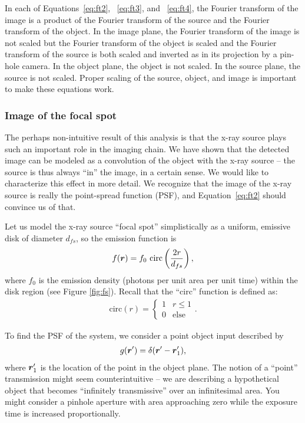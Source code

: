 \documentclass[mphy386-notes.tex]{subfiles}
\begin{document}
In each of Equations~\ref{eq:ft2}, ~\ref{eq:ft3}, and ~\ref{eq:ft4}, the Fourier transform of the image is a 
product of the Fourier transform of the source and the Fourier transform of the object.
In the image plane, the Fourier transform of the image is not scaled but the Fourier
transform of the object is scaled and the Fourier transform of the source is both scaled 
and inverted as in its projection by a pin-hole camera.  In the object plane, the object
is not scaled.  In the source plane, the source is not scaled.  Proper scaling of the source, object, and 
image is important to make these equations work.

\subsubsection{Image of the focal spot}

The perhaps non-intuitive result of this analysis is that the x-ray source plays
such an important role in the imaging chain. We have shown that the detected
image can be modeled as a convolution of the object with the x-ray source -- the
source is thus always ``in'' the image, in a certain sense. We would like to
characterize this effect in more detail.  We recognize that the image of the x-ray source
is really the point-spread function (PSF), and Equation~\ref{eq:ft2} should 
convince us of that.

Let us model the x-ray source ``focal spot'' simplistically as a uniform, emissive disk of
diameter $d_{fs}$, so the emission function is
\begin{align}
  f(\boldsymbol{r}) = f_0 \text{ circ}\left(\frac{2r}{d_{fs}}\right),
  \label{eq:fsdef}
\end{align}
where $f_0$ is the emission density (photons per unit area per unit time) within
the disk region (see Figure \ref{fig:fs}). Recall that the ``circ'' function is
defined as:
\begin{align}
  \text{circ}(r) =
  \begin{cases}
    1 & r \le 1\\
    0 & \text{else}
  \end{cases}.
\end{align}


To find the PSF of the system, we consider a point
object input described by
\begin{align}
  g(\boldsymbol{r}') = \delta(\boldsymbol{r}'-\boldsymbol{r}_1'),
  \label{eq:pinhole}
\end{align}
where $\boldsymbol{r}_1'$ is the location of the point in the object plane. The notion
of a ``point'' transmission might seem counterintuitive -- we are describing a
hypothetical object that becomes ``infinitely transmissive'' over an
infinitesimal area. You might consider a pinhole aperture with area
approaching zero while the exposure time is increased proportionally.
\end{document}
